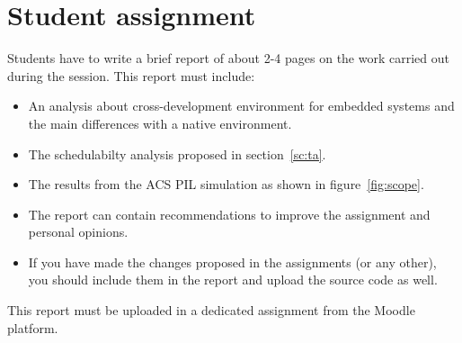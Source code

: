 \chapter{Student assignment}

Students have to write a brief report of about 2-4 pages
on the work carried out during the session.
This report must include:

\begin{itemize}
	\item An analysis about cross-development environment for embedded systems and the main differences with a native environment.
	\item The schedulabilty analysis proposed in section~\ref{sc:ta}.
	\item The results from the ACS PIL simulation as shown in figure~\ref{fig:scope}.
	\item The report can contain recommendations to improve the assignment and personal opinions.
	\item If you have made the changes proposed in the assignments (or any other), you should include them in the report and upload the source code as well.
\end{itemize}

This report must be uploaded in a dedicated assignment from the Moodle platform.